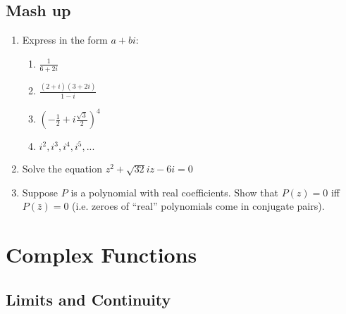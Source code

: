 \documentclass[11pt, oneside]{book}
\begin{document}

\section{Mash up} %
\label{sec:mash_up}

\begin{enumerate}
	\item Express in the form $a + bi$:
	\begin{enumerate}
		\item $\frac{1}{6 + 2i}$
		\item $\frac{(2 + i)(3 + 2i)}{1 - i}$
		\item $\left( - \frac{1}{2} + i \frac{\sqrt{3}}{2} \right)^4$
		\item $i^2, i^3, i^4, i^5, ...$
	\end{enumerate}

	\item Solve the equation $z^2 + \sqrt{32}iz - 6i = 0$

	\item Suppose $P$ is a polynomial with real coefficients. Show that $P(z) = 0$ iff $P(\bar{z}) = 0$ (i.e. zeroes of ``real'' polynomials come in conjugate pairs).
\end{enumerate}



\chapter{Complex Functions}
	\label{chapter:complex_functions}

\section{Limits and Continuity} %
\label{sec:limits_and_continuity}
\end{document}

